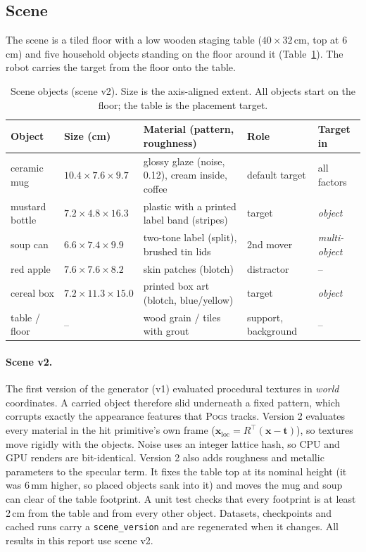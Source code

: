 \documentclass[10pt,a4paper]{article}
\newcommand{\pogs}{\textsc{Pogs}}
\begin{document}
\subsection{Scene}
\label{sec:scene}

The scene is a tiled floor with a low wooden staging table
($40\times32$\,cm, top at 6\,cm) and five household objects standing on the floor
around it (Table~\ref{tab:objects}). The robot carries the target from the floor
onto the table.

\begin{table}[h]
\centering\small
\caption{Scene objects (scene v2). Size is the axis-aligned extent. All objects
start on the floor; the table is the placement target.}
\label{tab:objects}
\begin{tabularx}{\linewidth}{l l X l l}
\toprule
Object & Size (cm) & Material (pattern, roughness) & Role & Target in \\
\midrule
ceramic mug    & $10.4\times7.6\times9.7$  & glossy glaze (noise, 0.12), cream inside, coffee & default target & all factors \\
mustard bottle & $7.2\times4.8\times16.3$  & plastic with a printed label band (stripes) & target & \emph{object} \\
soup can       & $6.6\times7.4\times9.9$   & two-tone label (split), brushed tin lids & 2nd mover & \emph{multi-object} \\
red apple      & $7.6\times7.6\times8.2$   & skin patches (blotch) & distractor & -- \\
cereal box     & $7.2\times11.3\times15.0$ & printed box art (blotch, blue/yellow) & target & \emph{object} \\
table / floor  & --                        & wood grain / tiles with grout & support, background & -- \\
\bottomrule
\end{tabularx}
\end{table}

\paragraph{Scene v2.} The first version of the generator (v1) evaluated
procedural textures in \emph{world} coordinates. A carried object therefore
slid underneath a fixed pattern, which corrupts exactly the appearance
features that \pogs{} tracks. Version 2 evaluates every material in the hit
primitive's own frame ($\mathbf{x}_{\text{loc}} = R^\top(\mathbf{x}-\mathbf{t})$),
so textures move rigidly with the objects. Noise uses an integer lattice hash,
so CPU and GPU renders are bit-identical. Version 2 also adds roughness and
metallic parameters to the specular term. It fixes the table top at its nominal
height (it was 6\,mm higher, so placed objects sank into it) and moves the mug
and soup can clear of the table footprint. A unit test checks that every
footprint is at least 2\,cm from the table and from every other object.
Datasets, checkpoints and cached runs carry a \texttt{scene\_version} and
are regenerated when it changes. All results in this report use scene v2.
\end{document}
